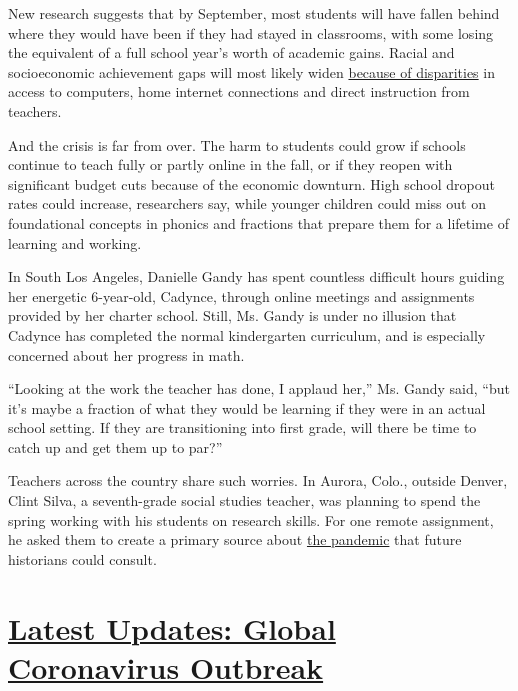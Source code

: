 New research suggests that by September, most students will have fallen
behind where they would have been if they had stayed in classrooms, with
some losing the equivalent of a full school year's worth of academic
gains. Racial and socioeconomic achievement gaps will most likely widen
\href{https://www.nytimes.com/2020/05/09/us/coronavirus-public-private-school.html}{because
of disparities} in access to computers, home internet connections and
direct instruction from teachers.

And the crisis is far from over. The harm to students could grow if
schools continue to teach fully or partly online in the fall, or if they
reopen with significant budget cuts because of the economic downturn.
High school dropout rates could increase, researchers say, while younger
children could miss out on foundational concepts in phonics and
fractions that prepare them for a lifetime of learning and working.

In South Los Angeles, Danielle Gandy has spent countless difficult hours
guiding her energetic 6-year-old, Cadynce, through online meetings and
assignments provided by her charter school. Still, Ms. Gandy is under no
illusion that Cadynce has completed the normal kindergarten curriculum,
and is especially concerned about her progress in math.

``Looking at the work the teacher has done, I applaud her,'' Ms. Gandy
said, ``but it's maybe a fraction of what they would be learning if they
were in an actual school setting. If they are transitioning into first
grade, will there be time to catch up and get them up to par?''

Teachers across the country share such worries. In Aurora, Colo.,
outside Denver, Clint Silva, a seventh-grade social studies teacher, was
planning to spend the spring working with his students on research
skills. For one remote assignment, he asked them to create a primary
source about \href{https://www.nytimes.com/news-event/coronavirus}{the
pandemic} that future historians could consult.

\hypertarget{latest-updates-global-coronavirus-outbreak}{%
\section{\texorpdfstring{\href{https://www.nytimes.com/2020/08/04/world/coronavirus-cases.html?action=click\&pgtype=Article\&state=default\&region=MAIN_CONTENT_1\&context=storylines_live_updates}{Latest
Updates: Global Coronavirus
Outbreak}}{Latest Updates: Global Coronavirus Outbreak}}\label{latest-updates-global-coronavirus-outbreak}}

